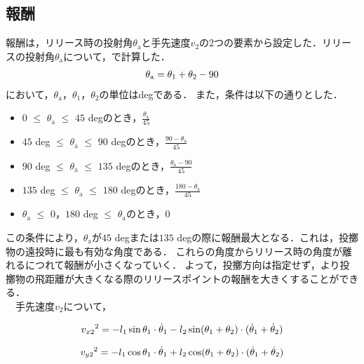 \subsection{報酬}
報酬は，リリース時の投射角$\theta_{\mathrm{a}}$と手先速度$v_{2}$の2つの要素から設定した．リリースの投射角$\theta_{\mathrm{a}}$について，で計算した．
\begin{eqnarray}
  \equlabel{2.19}
  \theta_{\mathrm{a}}=\theta_{1}+\theta_{2}-90
\end{eqnarray}
において，$\theta_{\mathrm{a}}$，$\theta_{1}$，$\theta_{2}$の単位はdegである．
また，条件は以下の通りとした．\\
\begin{itemize}
  \item $0$ $\le$ $\theta_{\mathrm{a}}$ $\le$ $45$ degのとき，$\frac{\theta_{\mathrm{a}}}{45}$
  \item $45$ deg $\le$ $\theta_{\mathrm{a}}$ $\le$ $90$ degのとき，$\frac{90-\theta_{\mathrm{a}}}{45}$
  \item $90$ deg $\le$ $\theta_{\mathrm{a}}$ $\le$ $135$ degのとき，$\frac{\theta_{\mathrm{a}}-90}{45}$
  \item $135$ deg $\le$ $\theta_{\mathrm{a}}$ $\le$ $180$ degのとき，$\frac{180-\theta_{\mathrm{a}}}{45}$
  \item $\theta_{\mathrm{a}}$ $\le$ $0$，$180$ deg $\le$ $\theta_{\mathrm{a}}$のとき，$0$\\
\end{itemize}

この条件により，$\theta_{\mathrm{a}}$が$45$ degまたは$135$ degの際に報酬最大となる．これは，投擲物の遠投時に最も有効な角度\cite{angle}である．
これらの角度からリリース時の角度が離れるにつれて報酬が小さくなっていく．
よって，投擲方向は指定せず，より投擲物の飛距離が大きくなる際のリリースポイントの報酬を大きくすることができる．\\
　手先速度$v_{2}$について，

\begin{eqnarray}
  \equlabel{2.20}
  {v_{x2}}^2=-l_{1}\sin\theta_{1}\cdot\dot{\theta}_{1}-l_2\sin(\theta_{1}+\theta_{2})\cdot(\dot{\theta}_{1}+\dot{\theta}_{2})
\end{eqnarray}

\begin{eqnarray}
  \equlabel{2.21}
  {v_{y2}}^2=-l_{1}\cos\theta_{1}\cdot\dot{\theta}_{1}+l_2\cos(\theta_{1}+\theta_{2})\cdot(\dot{\theta}_{1}+\dot{\theta}_{2})
\end{eqnarray}

